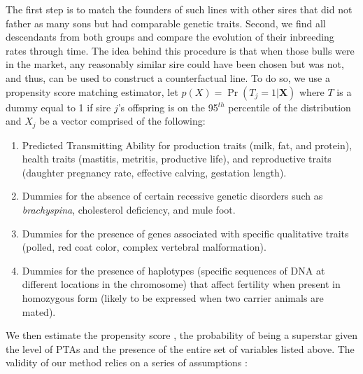 \documentclass[12pt,letterpaper]{article}
\begin{document}

The first step is to match the founders of such lines with other sires that did not father as many sons but had comparable genetic traits. Second, we find all descendants from both groups and compare the evolution of their inbreeding rates through time. 
The idea behind this procedure is that when those bulls were in the market, any reasonably similar sire could have been chosen but was not, and thus, can be used to construct a counterfactual line. 
 To do so, we use a propensity score matching estimator, let $p(X)=\Pr(T_{j} = 1 | \mathbf{X})$ where $T$ is a dummy equal to 1 if sire $j$'s offspring is on the 95$^{th}$ percentile of the distribution and $X_{j}$ be a vector comprised of the following:

\begin{enumerate}
    \item Predicted Transmitting Ability for production traits (milk, fat, and protein), health traits (mastitis, metritis, productive life), and reproductive traits (daughter pregnancy rate, effective calving, gestation length).
    \item Dummies for the absence of certain recessive genetic disorders \citep{sire_workbbok2021} such as \textit{brachyspina}, cholesterol deficiency, and mule foot.
    \item Dummies for the presence of genes associated with specific qualitative traits (polled, red coat color, complex vertebral malformation).
    \item Dummies for the presence of haplotypes (specific sequences of DNA at different locations in the chromosome) that affect fertility \citep{haplotypes2018} when present in homozygous form (likely to be expressed when two carrier animals are mated).
\end{enumerate}

We then estimate the propensity score \citep[p.~873]{Cameron_Trivedi2005}, the probability of being a superstar given the level of PTAs and the presence of the entire set of variables listed above. The validity of our method relies on a series of assumptions \citep{Heckman1997}:
\end{document}
